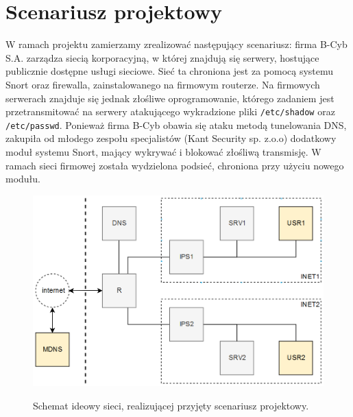 \documentclass{eiti-raport}
\begin{document}
\section{Scenariusz projektowy}
W ramach projektu zamierzamy zrealizować następujący scenariusz: firma B-Cyb S.A. zarządza siecią korporacyjną, w której znajdują się serwery, hostujące publicznie dostępne usługi sieciowe. Sieć ta chroniona jest za pomocą systemu Snort oraz firewalla, zainstalowanego na firmowym routerze. Na firmowych serwerach znajduje się jednak złośliwe oprogramowanie, którego zadaniem jest przetransmitować na serwery atakującego wykradzione pliki \texttt{/etc/shadow} oraz \texttt{/etc/passwd}. Ponieważ firma B-Cyb obawia się ataku metodą tunelowania DNS, zakupiła od młodego zespołu specjalistów (Kant Security sp. z.o.o) dodatkowy moduł systemu Snort, mający wykrywać i blokować złośliwą transmisję. W ramach sieci firmowej została wydzielona podsieć, chroniona przy użyciu nowego modułu. 

\begin{figure} \centering
	\includegraphics[width=0.9\linewidth]{img/BCYB-topologia.PNG}
	\label{fig:topologia}
	\caption{Schemat ideowy sieci, realizującej przyjęty scenariusz projektowy.}
\end{figure}
\end{document}
